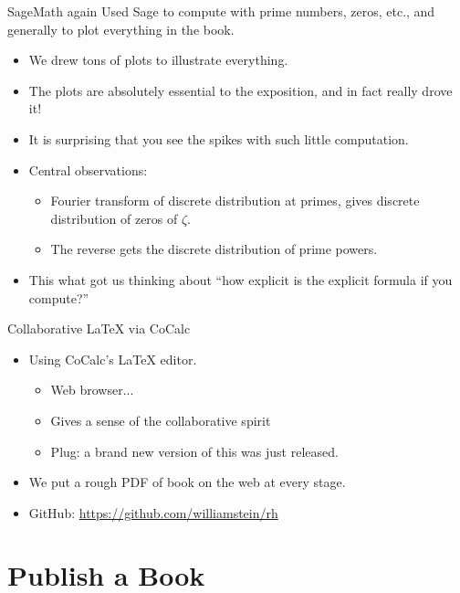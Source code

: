 \documentclass{beamer}
\begin{document}
\begin{frame}{SageMath again}
  Used Sage to compute with prime numbers, zeros, etc., and generally to plot everything in the book.
  \begin{itemize}
    \item We drew tons of plots to illustrate everything.
    \item The plots are absolutely essential to the exposition, and in fact really drove it!
    \item It is surprising that you see the spikes with such little computation.
    \item Central observations:
          \begin{itemize}
            \item Fourier transform of discrete distribution at primes, gives discrete distribution of zeros of $\zeta$.
            \item The reverse gets the discrete distribution of prime powers.
          \end{itemize}
    \item This what got us thinking about ``how explicit is the explicit formula if you compute?''
  \end{itemize}
\end{frame}


\begin{frame}{Collaborative \LaTeX{} via CoCalc}
  \begin{block}{}
    \begin{itemize}
      \item Using CoCalc's \LaTeX{} editor.
            \begin{itemize}
              \item Web browser...
              \item Gives a sense of the collaborative spirit
              \item Plug: a brand new version of this was just released.
            \end{itemize}
      \item We put a rough PDF of book on the web at every stage.
      \item GitHub: \url{https://github.com/williamstein/rh}
    \end{itemize}
  \end{block}
\end{frame}


\section{Publish a Book}
\end{document}
